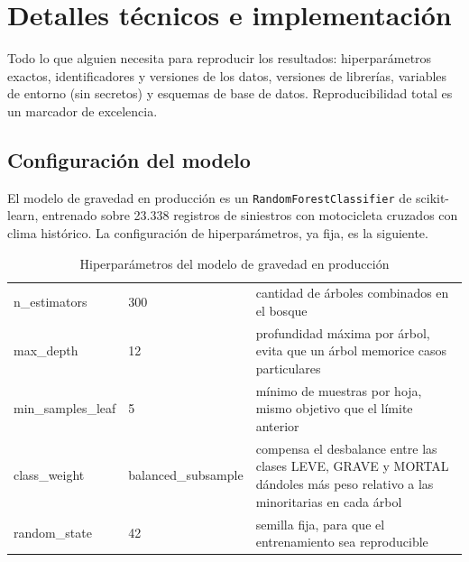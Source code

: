 
\chapter{Detalles técnicos e implementación}\label{apx:tecnicos}

\begin{guia}
Todo lo que alguien necesita para reproducir los resultados:
hiperparámetros exactos, identificadores y versiones de los datos,
versiones de librerías, variables de entorno (sin secretos) y esquemas
de base de datos. Reproducibilidad total es un marcador de excelencia.
\end{guia}

\section{Configuración del modelo}

El modelo de gravedad en producción es un \texttt{RandomForestClassifier}
de scikit-learn, entrenado sobre 23.338 registros de siniestros con
motocicleta cruzados con clima histórico. La configuración de
hiperparámetros, ya fija, es la siguiente.

\begin{table}[H]
    \centering
    \caption{Hiperparámetros del modelo de gravedad en producción}
    \label{tab:hiperparametros}
    \small
    \begin{tabularx}{\textwidth}{l l L}
        \toprule
         &  &  \\
        \midrule
        n\_estimators & 300 & cantidad de árboles combinados en el bosque \\
        max\_depth & 12 & profundidad máxima por árbol, evita que un árbol memorice casos particulares \\
        min\_samples\_leaf & 5 & mínimo de muestras por hoja, mismo objetivo que el límite anterior \\
        class\_weight & balanced\_subsample & compensa el desbalance entre las clases LEVE, GRAVE y MORTAL dándoles más peso relativo a las minoritarias en cada árbol \\
        random\_state & 42 & semilla fija, para que el entrenamiento sea reproducible \\
        \bottomrule
    \end{tabularx}
\end{table}

